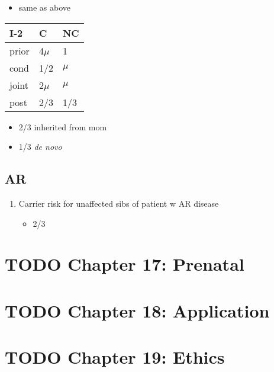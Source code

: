 \documentclass{scrartcl}
\begin{document}
\begin{enumerate}
\begin{itemize}
\item same as above
\end{itemize}

\begin{center}
\begin{tabular}{lll}
I-2 & C & NC\\
\hline
prior & 4\(\mu\) & 1\\
cond \footnotemark & 1/2 & \(\mu\)\\
joint & 2\(\mu\) & \(\mu\)\\
post & 2/3 & 1/3\\
\end{tabular}
\end{center}


\begin{itemize}
\item 2/3 inherited from mom
\item 1/3 \emph{de novo}
\end{itemize}
\end{enumerate}
\subsection{AR}
\label{sec:org6f539cf}
\begin{enumerate}
\item Carrier risk for unaffected sibs of patient w AR disease
\label{sec:orgb715493}
\begin{itemize}
\item 2/3
\end{itemize}
\end{enumerate}

\section{{\bfseries\sffamily TODO} Chapter 17: Prenatal}
\label{sec:orgf6c05da}
\section{{\bfseries\sffamily TODO} Chapter 18: Application}
\label{sec:org1b11484}
\section{{\bfseries\sffamily TODO} Chapter 19: Ethics}
\label{sec:org55f1f21}
\end{document}
